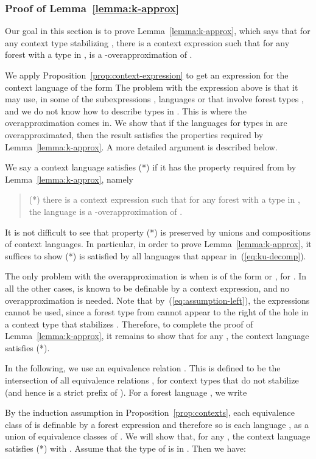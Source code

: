 \documentclass{LMCS}
\begin{document}
\subsubsection{Proof of Lemma~\ref{lemma:k-approx}}
\label{sec:proof-lemma-k}
Our goal in this section is to prove Lemma~\ref{lemma:k-approx}, which
says that for any context type  stabilizing , there is a
 context expression  such that for any forest
 with a type in ,  is a
-overapproximation of .

We apply Proposition~\ref{prop:context-expression} to get an
expression for the context language  of the form
 The problem with the expression above is that it may use,
in some of the subexpressions , languages
 or   that involve  forest types , and we do not know
how to describe types in . This is where the
overapproximation comes in. We show that if the languages for types in
 are overapproximated, then the result satisfies the
properties required by Lemma~\ref{lemma:k-approx}. A more detailed
argument is described below.

We say a context language  satisfies (*) if it has the property
required from  by Lemma~\ref{lemma:k-approx}, namely
\begin{quote}
	(*) there
	is a  context expression  such that for any
	forest  with a type in , the language  is a
	-overapproximation of .	
\end{quote}
  It is not difficult to see that
property (*) is preserved by unions and compositions of context
languages. In particular, in order to prove
Lemma~\ref{lemma:k-approx}, it suffices to show (*) is satisfied by
all languages  that appear in~(\ref{eq:ku-decomp}).

The only problem with the overapproximation is when  is of
the form  or , for . In all
the other cases,  is known to be definable by a 
context expression, and no overapproximation is needed. Note that
by~(\ref{eq:assumption-left}), the expressions  cannot be
used, since a forest type from  cannot appear to the right
of the hole in a context type that stabilizes . Therefore, to complete
the proof of Lemma~\ref{lemma:k-approx}, it remains to show that for
any , the context language  satisfies
(*).

In the following, we use an equivalence relation . This is defined
to be the intersection of all equivalence relations , for context
types  that do not stabilize  (and hence  is a strict prefix of ).
For a forest language , we write

By the induction assumption in Proposition~\ref{prop:contexts}, each
equivalence class of  is definable by a  forest
expression and therefore so is each language , as a union of
equivalence classes of . We will show that, for any , the context language  satisfies (*) with
.  Assume that the type of  is
 in . Then we have:
\end{document}
